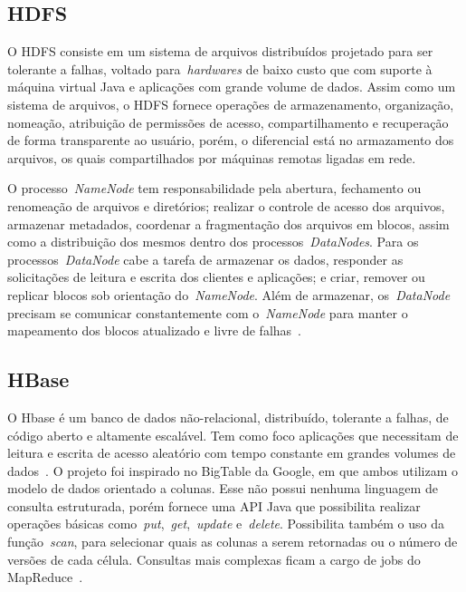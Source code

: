 \documentclass[12pt]{article}
\begin{document}
\subsection{HDFS}

O HDFS consiste em um sistema de arquivos distribuídos projetado para ser tolerante a falhas, voltado para~\emph{hardwares} de baixo custo que com suporte à máquina virtual Java e aplicações com grande volume de dados. 
Assim como um sistema de arquivos, o HDFS fornece operações de armazenamento, organização, nomeação, atribuição de permissões de acesso, compartilhamento e recuperação de forma transparente ao usuário, porém, o diferencial está no armazamento dos arquivos, os quais compartilhados por máquinas remotas ligadas em rede.

O processo~\emph{NameNode} tem responsabilidade pela abertura, fechamento ou renomeação de arquivos e diretórios; realizar o controle de acesso dos arquivos, armazenar metadados, coordenar a fragmentação dos arquivos em blocos, assim como a distribuição dos mesmos dentro dos processos~\emph{DataNodes}. 
Para os processos~\emph{DataNode} cabe a tarefa de armazenar os dados, responder as solicitações de leitura e escrita dos clientes e aplicações; e criar, remover ou replicar blocos sob orientação do~\emph{NameNode}. 
Além de armazenar, os~\emph{DataNode} precisam se comunicar constantemente com o~\emph{NameNode} para manter o mapeamento dos blocos atualizado e livre de falhas~\cite{hadoophdfs}.

\subsection{HBase}

O Hbase é um banco de dados não-relacional, distribuído, tolerante a falhas, de código aberto e altamente escalável. Tem como foco aplicações que necessitam de leitura e escrita de acesso aleatório com tempo constante em grandes volumes de dados~\cite{hadoophbase}.
O projeto foi inspirado no BigTable da Google, em que ambos utilizam o modelo de dados orientado a colunas. 
Esse não possui nenhuma linguagem de consulta estruturada, porém fornece uma API Java que possibilita realizar operações básicas como~\emph{put},~\emph{get},~\emph{update} e~\emph{delete}. 
Possibilita também o uso da função~\emph{scan}, para selecionar quais as colunas a serem retornadas ou o número de versões de cada célula. Consultas mais complexas ficam a cargo de jobs do MapReduce~\cite{cunha2015column}.

\end{document}

